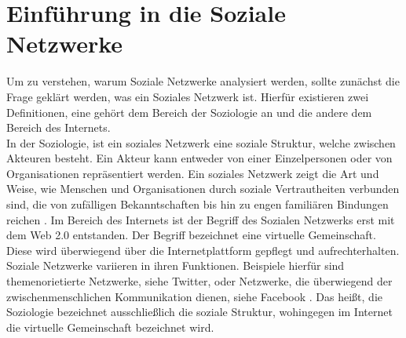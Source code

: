 \chapter{Einführung in die Soziale Netzwerke}\label{ch:SNA}
Um zu verstehen, warum Soziale Netzwerke analysiert werden, sollte zunächst die Frage geklärt werden, was ein Soziales Netzwerk ist. Hierfür existieren zwei Definitionen, eine gehört dem Bereich der Soziologie an und die andere dem Bereich des Internets. \\
In der Soziologie, ist ein soziales Netzwerk eine soziale Struktur, welche zwischen Akteuren besteht. Ein Akteur kann entweder von einer Einzelpersonen oder  von Organisationen repräsentiert werden. Ein soziales Netzwerk zeigt die Art und Weise, wie Menschen und Organisationen durch soziale Vertrautheiten verbunden sind, die von zufälligen Bekanntschaften bis hin zu engen familiären Bindungen reichen \cite{SNADefinition}. Im Bereich des Internets ist der Begriff des Sozialen Netzwerks erst mit dem Web 2.0 entstanden. Der Begriff bezeichnet eine virtuelle Gemeinschaft. Diese wird überwiegend über die Internetplattform gepflegt und aufrechterhalten. Soziale Netzwerke variieren in ihren Funktionen. Beispiele hierfür sind themenorietierte Netzwerke, siehe Twitter, oder Netzwerke, die überwiegend der zwischenmenschlichen Kommunikation dienen, siehe Facebook \cite{SNAWeb2.0}. Das heißt, die Soziologie bezeichnet ausschließlich die soziale Struktur, wohingegen im Internet die virtuelle Gemeinschaft bezeichnet wird.

